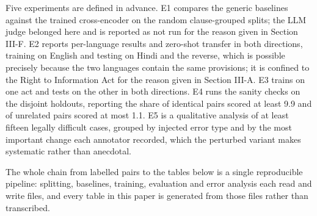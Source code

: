 \documentclass[conference]{IEEEtran}
\begin{document}
Five experiments are defined in advance. E1 compares the generic baselines against the trained cross-encoder on the random clause-grouped splits; the LLM judge belonged here and is reported as not run for the reason given in Section III-F. E2 reports per-language results and zero-shot transfer in both directions, training on English and testing on Hindi and the reverse, which is possible precisely because the two languages contain the same provisions; it is confined to the Right to Information Act for the reason given in Section III-A. E3 trains on one act and tests on the other in both directions. E4 runs the sanity checks on the disjoint holdouts, reporting the share of identical pairs scored at least 9.9 and of unrelated pairs scored at most 1.1. E5 is a qualitative analysis of at least fifteen legally difficult cases, grouped by injected error type and by the most important change each annotator recorded, which the perturbed variant makes systematic rather than anecdotal.

The whole chain from labelled pairs to the tables below is a single reproducible pipeline: splitting, baselines, training, evaluation and error analysis each read and write files, and every table in this paper is generated from those files rather than transcribed.
\end{document}

